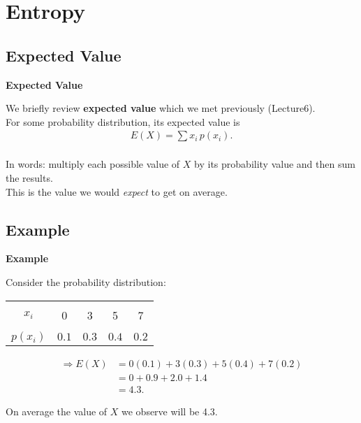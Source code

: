 \documentclass[compress]{beamer}        %
\makeatletter
\newcommand{\tcb}{\textcolor{beamer@blendedblue}}
\makeatother
\begin{document}
\section{Entropy}
\subsection{Expected Value}
\begin{frame}{\bf \tcb{Expected Value}}

We briefly review {\bf expected value} which we met previously (Lecture6).\\[0.6cm]

For some probability distribution, its expected value is\\
\begin{align*}
\boxed{E(X) = \sum x_i \, p(x_i)}.\\
\end{align*}


In words: multiply each possible value of $X$ by its probability value and then sum the results.\\[0.8cm]

This is the value we would \emph{expect} to get on average.


\end{frame}


\subsection{Example}
\begin{frame}{\bf \tcb{Example}}

Consider the probability distribution:\\[0.6cm]
\begin{center}
\begin{tabular}{|c|cccc|}
\hline
&&&&\\[-0.3cm]
$x_i$ & 0 & 3 & 5 & 7 \\[0.1cm]
\hline
&&&&\\[-0.3cm]
$p(x_i)$ & $0.1$ & $0.3$ & $0.4$ & $0.2$ \\[0.1cm]
\hline
\end{tabular}
\end{center}


\begin{align*}
\Rightarrow E(X) &= 0(0.1)+3(0.3)+5(0.4)+7(0.2) \\[0.4cm]
&= 0 + 0.9 + 2.0 + 1.4 \\[0.4cm]
&= 4.3.
\end{align*}

On average the value of $X$ we observe will be 4.3.

\end{frame}
\end{document}
